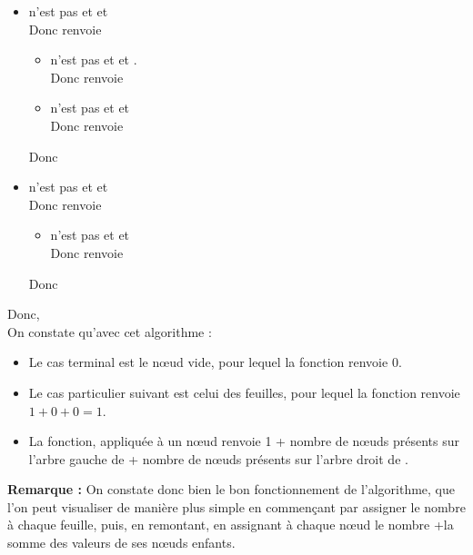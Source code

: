 \documentclass[11pt,a4paper,french,twoside]{PMCours}
\begin{document}
\begin{itemize}
\item {} n'est pas  et  et \\
Donc  renvoie 
\begin{itemize}
\item {} n'est pas  et  et .\\
Donc  renvoie 
\item {} n'est pas  et  et \\
Donc  renvoie 
\end{itemize}
Donc 
\item {} n'est pas  et  et \\
Donc  renvoie 
\begin{itemize}
\item {} n'est pas  et  et \\
Donc  renvoie 
\end{itemize}
Donc 
\end{itemize}
Donc, 
\medskip\\
On constate qu'avec cet algorithme : 
\begin{itemize}
\item Le cas terminal est le nœud vide, pour lequel la fonction renvoie $0$.
\item Le cas particulier suivant est celui des feuilles, pour lequel la fonction renvoie $1+0+0=1$.
\item La fonction, appliquée à un nœud  renvoie 1 + nombre de nœuds présents sur l'arbre gauche de  + nombre de nœuds présents sur l'arbre droit de .
\end{itemize}
{\bf Remarque : }On constate donc bien le bon fonctionnement de l'algorithme, que l'on peut visualiser de manière plus simple en commençant par assigner le nombre  à chaque feuille, puis, en remontant, en assignant à chaque nœud le nombre +la somme des valeurs de ses nœuds enfants.
\end{document}
